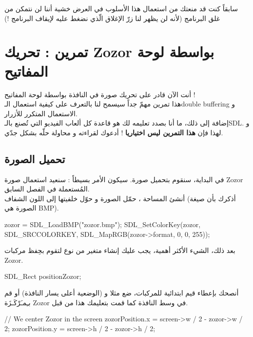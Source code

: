 سابقاً كنت قد منعتك من استعمال هذا الأسلوب في العرض خشية أننا لن نتمكن من غلق البرنامج (لأنه لن يظهر لنا زرّ الإغلاق الّذي نضغط عليه لإيقاف البرنامج !)

\section{تمرين : تحريك \textenglish{Zozor} بواسطة لوحة المفاتيح}

أنت الآن قادر على تحريك صورة في النافذة بواسطة لوحة المفاتيح !\\
هذا تمرين مهمّ جداً سيسمح لنا بالتعرف على كيفية استعمال الـ\textenglish{double buffering}
و الاستعمال المتكرر للأزرار.\\
إضافة إلى ذلك، ما أنا بصدد تعليمه لك هو قاعدة كل ألعاب الفيديو التي تُصنع بالـ\textenglish{SDL}.
و لهذا فإن
\textbf{هذا التمرين ليس اختياريا}
! أدعوك لقراءته و محاولة حلّه بشكل جدّي.

\subsection{تحميل الصورة}

في البداية، سنقوم بتحميل صورة. سيكون الأمر بسيطاً : سنعيد استعمال صورة 
\textenglish{Zozor}
المُستعملة في الفصل السابق.\\
أنشئ المساحة
،
حمّل الصورة و حوّل خلفيتها إلى اللون الشفاف (أذكرك بأن صيغة الصورة هي 
\textenglish{BMP}).

\begin{Csource}
zozor = SDL_LoadBMP("zozor.bmp");
SDL_SetColorKey(zozor, SDL_SRCCOLORKEY, SDL_MapRGB(zozor->format, 0, 0, 255));
\end{Csource}

بعد ذلك، الشيء الأكثر أهمية، يجب عليك إنشاء متغير من نوع
لتقوم بحِفظ مركبات
\textenglish{Zozor}.

\begin{Csource}
SDL_Rect positionZozor;
\end{Csource}

أنصحك بإعطاء قيم ابتدائية للمركبات، ضع مثلا
و 
(الوضعية أعلى يسار النافذة) أو قم بـِمـَرْكَـزَة
\textenglish{Zozor}
في وسط النافذة كما قمت بتعليمك هذا من قبل.

\begin{Csource}
// We center Zozor in the screen
zozorPosition.x = screen->w / 2 - zozor->w / 2;
zozorPosition.y = screen->h / 2 - zozor->h / 2;
\end{Csource}

